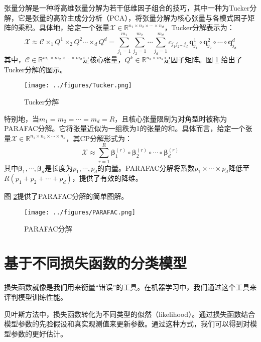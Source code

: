 \documentclass[AutoFakeBold]{LZUThesis}
\newcommand{\scite}[1]{\textsuperscript{\cite{#1}}}
\begin{document}
张量分解是一种将高维张量分解为若干低维因子组合的技巧，其中一种为Tucker分解\scite{tucker1966some}，它是张量的高阶主成分分析（PCA），将张量分解为核心张量与各模式因子矩阵的乘积。具体地，给定一个张量$\mathcal{X} \in \mathbb{R}^{n_1 \times n_2 \times \cdots \times n_d}$，Tucker分解表示为：
\begin{equation}
	\mathcal{X} \approx \mathcal{C} \times_1 Q^1 \times_2 Q^2 \cdots \times_d Q^d = \sum_{j_1=1}^{m_1} \sum_{j_2=1}^{m_2} \cdots \sum_{j_d=1}^{m_d} c_{j_1 j_2 \dots j_d} 
	\, \mathbf{q}^{1}_{j_1} \circ \mathbf{q}^{2}_{j_2} \circ \cdots \circ \mathbf{q}^{d}_{j_d} \label{Equation:Tucker}
\end{equation}
其中，$\mathcal{C}\in \mathbb{R}^{m_1 \times m_2 \times \cdots \times m_d}$是核心张量，$Q^{k} \in \mathbb{R}^{n_k \times m_k}$是因子矩阵。图 \ref{Fig:Tucker}\scite{bi2021tensors} 给出了Tucker分解的图示。
\begin{figure}[h]
	\small
	\centering
	\texttt{[image: ../figures/Tucker.png]}
	\caption{Tucker分解}
	\label{Fig:Tucker}
\end{figure}
特别地，当$m_{1} =m_{2} = \cdots =m_{d} = R$，且核心张量限制为对角型时被称为PARAFAC分解。它将张量近似为一组秩为1的张量的和。具体而言，给定一个张量$\mathcal{X} \in \mathbb{R}^{n_1 \times n_2 \times \cdots \times n_d}$，其CP分解形式为：
\begin{equation}
	\mathcal{X} \approx \sum_{r=1}^{R} \boldsymbol{\beta}_1^{(r)} \circ \boldsymbol{\beta}_2^{(r)} \circ \cdots \circ \boldsymbol{\beta}_d^{(r)}
\end{equation}
其中$\boldsymbol{\beta}_{1},\cdots,\boldsymbol{\beta}_{d}$是长度为$p_{1},\cdots,p_{d}$的向量。PARAFAC分解将系数$p_{1}\times\cdots\times p_{d}$降低至$R(p_{1} + p_{2} +\cdots +p_{d})$，提供了有效的降维。

图 \ref{Fig:PARAFAC}\scite{bi2021tensors}提供了PARAFAC分解的简单图解。
\begin{figure}[h]
	\small
	\centering
	\texttt{[image: ../figures/PARAFAC.png]}
	\caption{PARAFAC分解
	}
	\label{Fig:PARAFAC}
\end{figure}
\section{基于不同损失函数的分类模型}
损失函数就像是我们用来衡量“错误”的工具。在机器学习中，我们通过这个工具来评判模型训练性能。

贝叶斯方法中，损失函数转化为不同类型的似然（likelihood）。通过损失函数结合模型参数的先验假设和真实观测值来更新参数。通过这种方式，我们可以得到对模型参数的更好估计。
\end{document}
